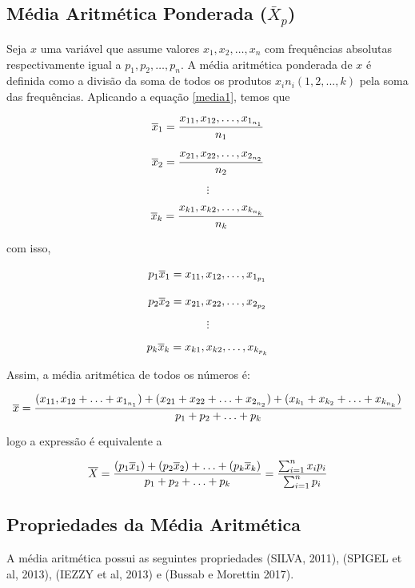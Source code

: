 \newpage
\subsection{Média Aritmética Ponderada ($\bar{X}_{p}$)}

Seja $x$ uma variável que assume valores $x_{1},x_{2},\ldots,x_{n}$ com frequências absolutas respectivamente igual a $p_{1},p_{2},\ldots,p_{n}$. A média aritmética ponderada de $x$ é  definida como a divisão da soma de todos os produtos $x_{i} n_{i}(1,2,...,k)$ pela soma das frequências. Aplicando a equação \ref{media1}, temos que


$$
\Bar{x}_{1}=\frac{x_{11},x_{12},\ldots, x_{1_{n_{1}}}}{n_{1}}
$$

$$
\Bar{x}_{2}=\frac{x_{21},x_{22},\ldots, x_{2_{n_{2}}}}{n_{2}}
$$

$$
\vdots
$$

$$
\Bar{x}_{k}=\frac{x_{k1},x_{k2},\ldots, x_{k_{n_{k}}}}{n_{k}}
$$

com isso, 

$$
p_{1}\Bar{x}_{1}=x_{11},x_{12},\ldots, x_{1_{p_{1}}}
$$

$$
p_{2}\Bar{x}_{2}=x_{21},x_{22},\ldots, x_{2_{p_{2}}}
$$

$$
\vdots
$$

$$
p_{k}\Bar{x}_{k}=x_{k1},x_{k2},\ldots, x_{k_{p_{k}}}
$$

Assim, a média aritmética de todos os números é:

$$
\Bar{x}=\frac{(x_{11},x_{12}+\ldots+x_{1_{n_{1}}})+(x_{21}+x_{22}+\ldots+x_{2_{n_{2}}})+(x_{k_{1}}+x_{k_{2}}+\ldots+x_{k_{n_{k}}})}{p_{1}+p_{2}+\ldots+p_{k}}
$$


logo a expressão é equivalente a

\begin{equation}\label{media}
    \bar{X}= \frac{(p_{1}\Bar{x}_{1})+(p_{2}\Bar{x}_{2})+\ldots+(p_{k}\Bar{x}_{k})}{p_{1}+p_{2}+\ldots+p_{k}}=\frac{\sum_{i=1}^{n}x_{i}p_{i}}{\sum_{i=1}^{n}p_{i}}
\end{equation}







\newpage
\subsection{Propriedades da Média Aritmética}

A média aritmética possui as seguintes propriedades (SILVA, 2011), (SPIGEL et al, 2013), (IEZZY et al, 2013) e (Bussab e Morettin 2017). 

